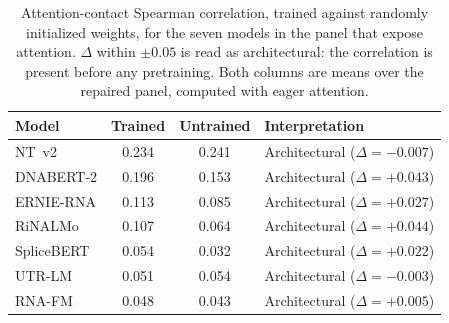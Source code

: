 \begin{table}[htbp]
\centering
\caption{Attention-contact Spearman correlation, trained against randomly
initialized weights, for the seven models in the panel that expose attention.
$\Delta$ within $\pm 0.05$ is read as architectural: the
correlation is present before any pretraining. Both columns are means over the
repaired panel, computed with eager attention.}
\label{tab:attn_trained_untrained}
\small
\begin{tabular}{@{}lccl@{}}
\toprule
\textbf{Model} & \textbf{Trained} & \textbf{Untrained} & \textbf{Interpretation} \\
\midrule
NT~v2        & 0.234 & 0.241 & Architectural ($\Delta = -0.007$) \\
DNABERT-2    & 0.196 & 0.153 & Architectural ($\Delta = +0.043$) \\
ERNIE-RNA    & 0.113 & 0.085 & Architectural ($\Delta = +0.027$) \\
RiNALMo      & 0.107 & 0.064 & Architectural ($\Delta = +0.044$) \\
SpliceBERT   & 0.054 & 0.032 & Architectural ($\Delta = +0.022$) \\
UTR-LM       & 0.051 & 0.054 & Architectural ($\Delta = -0.003$) \\
RNA-FM       & 0.048 & 0.043 & Architectural ($\Delta = +0.005$) \\
\bottomrule
\end{tabular}
\end{table}
